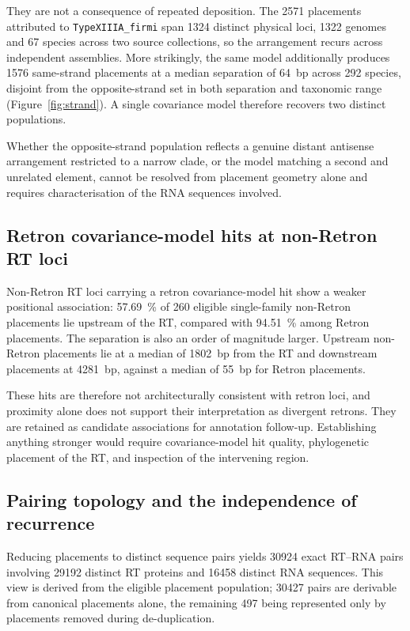 They are not a consequence of repeated deposition. The \num{2571} placements attributed to
\texttt{TypeXIIIA\_firmi} span \num{1324} distinct physical loci, \num{1322} genomes and 67 species
across two source collections, so the arrangement recurs across independent assemblies. More
strikingly, the same model additionally produces \num{1576} same-strand placements at a median
separation of 64~bp across 292 species, disjoint from the opposite-strand set in both separation and
taxonomic range (Figure~\ref{fig:strand}). A single covariance model therefore recovers two distinct
populations.

Whether the opposite-strand population reflects a genuine distant antisense arrangement restricted
to a narrow clade, or the model matching a second and unrelated element, cannot be resolved from
placement geometry alone and requires characterisation of the RNA sequences involved.

\subsection{Retron covariance-model hits at non-Retron RT loci}
\label{sec:dbchar:nonretron}

Non-Retron RT loci carrying a retron covariance-model hit show a weaker positional association:
\SI{57.69}{\percent} of 260 eligible single-family non-Retron placements lie upstream of the RT,
compared with \SI{94.51}{\percent} among Retron placements. The separation is also an order of
magnitude larger. Upstream non-Retron placements lie at a median of \num{1802}~bp from the RT and
downstream placements at \num{4281}~bp, against a median of 55~bp for Retron placements.

These hits are therefore not architecturally consistent with retron loci, and proximity alone does
not support their interpretation as divergent retrons. They are retained as candidate associations
for annotation follow-up. Establishing anything stronger would require covariance-model hit quality,
phylogenetic placement of the RT, and inspection of the intervening region.

\subsection{Pairing topology and the independence of recurrence}
\label{sec:dbchar:topology}

Reducing placements to distinct sequence pairs yields \num{30924} exact RT--RNA pairs involving
\num{29192} distinct RT proteins and \num{16458} distinct RNA sequences. This view is derived from
the eligible placement population; \num{30427} pairs are derivable from canonical placements alone,
the remaining 497 being represented only by placements removed during de-duplication.

